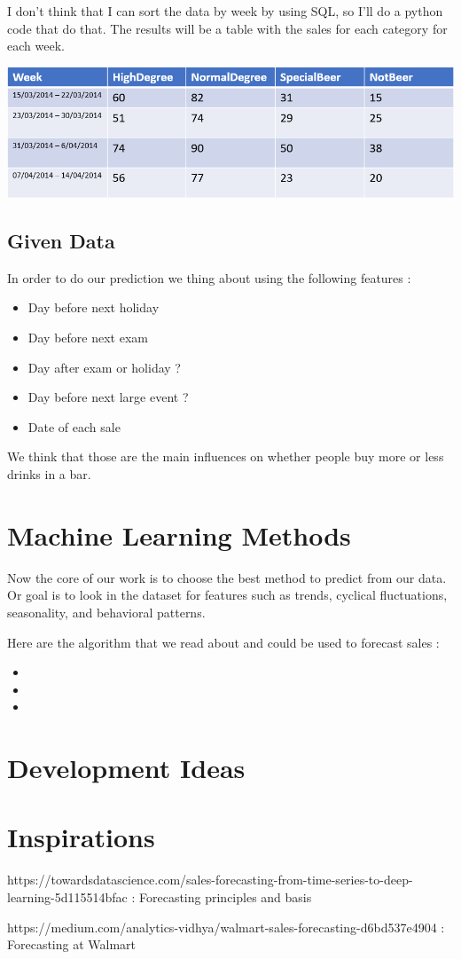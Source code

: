 \documentclass{report}
\begin{document}
I don't think that I can sort the data by week by using SQL, so I'll do a python code that do that. The results will be a table with the sales for each category for each week.


\includegraphics{FormatTable}

\section{Given Data}

In order to do our prediction we thing about using the following features :
\begin{itemize}
\item Day before next holiday 
\item Day before next exam
\item Day after exam or holiday ?
\item Day before next large event ?
\item Date of each sale
\end{itemize}

We think that those are the main influences on whether people buy more or less drinks in a bar.


\section{}

\chapter{Machine Learning Methods}

Now the core of our work is to choose the best method to predict from our data. Or goal is to look in the dataset for features such as trends, cyclical fluctuations, seasonality, and behavioral patterns.



Here are the algorithm that we read about and could be used to forecast sales :
\begin{itemize}
\item
\item
\item
\end{itemize}

\chapter{Development Ideas}



\chapter{Inspirations}

https://towardsdatascience.com/sales-forecasting-from-time-series-to-deep-learning-5d115514bfac : Forecasting principles and basis 

https://medium.com/analytics-vidhya/walmart-sales-forecasting-d6bd537e4904 : Forecasting at Walmart 
\end{document}
